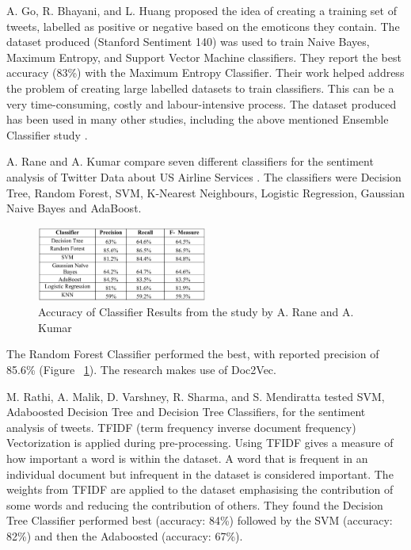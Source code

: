 A. Go, R. Bhayani, and L. Huang \cite{Go2009} proposed the  idea of creating a training set of tweets, labelled as positive or negative based on the emoticons they contain. The dataset produced (Stanford Sentiment 140) was used to train Naive Bayes, Maximum Entropy, and Support Vector Machine classifiers. They report the best accuracy (83\%) with the Maximum Entropy Classifier. Their work helped address the problem of creating large labelled datasets to train classifiers. This can be a very time-consuming, costly and labour-intensive process. The dataset produced has been used in many other studies, including the above mentioned Ensemble Classifier study \cite{Ankit2018}.

A. Rane and A. Kumar compare seven different classifiers for the sentiment analysis of Twitter Data about US Airline Services \cite{Rane2018}. The classifiers were Decision Tree, Random Forest, SVM, K-Nearest Neighbours, Logistic Regression, Gaussian Naive Bayes and AdaBoost.
\begin{figure}
    \centering
    \setlength{\belowcaptionskip}{-10pt}
    \includegraphics[width=0.5\textwidth]{literature_review/arane_classifier_results.PNG}
    \caption{Accuracy of Classifier Results from the study by A. Rane and A. Kumar \cite{Rane2018}}
    \label{fig:arane}
\end{figure}
 The Random Forest Classifier performed the best, with reported precision of 85.6\% (Figure ~\ref{fig:arane}). The research makes use of Doc2Vec.

M. Rathi, A. Malik, D. Varshney, R. Sharma, and S. Mendiratta \cite{Raithi2018} tested SVM, Adaboosted Decision Tree and Decision Tree Classifiers, for the sentiment analysis of tweets. TFIDF (term frequency inverse document frequency) Vectorization is applied during pre-processing. Using TFIDF gives a measure of how important a word is within the dataset. A word that is frequent in an individual document but infrequent in the dataset is considered important. The weights from TFIDF are applied to the dataset emphasising the contribution of some words and reducing the contribution of others. They found the Decision Tree Classifier performed best  (accuracy: 84\%) followed by the SVM (accuracy: 82\%) and then the Adaboosted (accuracy: 67\%). 

